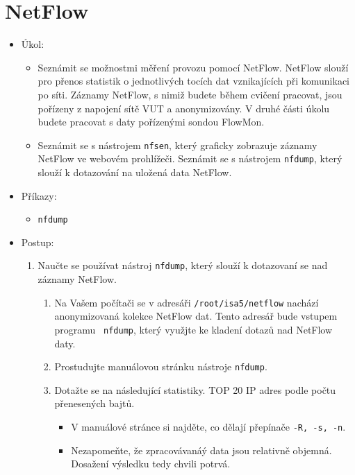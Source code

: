 \section{NetFlow}
  \begin{itemize}
    \item Úkol:
        \begin{itemize}
            \item Seznámit se možnostmi měření provozu pomocí NetFlow. NetFlow slouží pro
            přenos statistik o jednotlivých tocích dat vznikajících při komunikaci po síti.
            Záznamy NetFlow, s nimiž budete během cvičení pracovat, jsou
            pořízeny z napojení sítě VUT a anonymizovány. V druhé části úkolu
            budete pracovat s daty pořízenými sondou FlowMon.
            \item Seznámit se s nástrojem {\tt nfsen}, který graficky zobrazuje záznamy
            NetFlow ve webovém prohlížeči. Seznámit se s nástrojem {\tt nfdump}, který slouží k dotazování na uložená data NetFlow.
        \end{itemize}
    \item Příkazy:
        \begin{itemize}
            \item {\tt nfdump}
        \end{itemize}
    \item Postup:
        \begin{enumerate}
            \item Naučte se používat nástroj {\tt nfdump}, který slouží k dotazovaní se nad záznamy NetFlow.
                \begin{enumerate}
                    \item Na Vašem počítači se v adresáři {\tt /root/isa5/netflow} nachází
                    anonymizovaná kolekce NetFlow dat. Tento adresář bude vstupem programu {\tt
                    nfdump}, který využjte ke kladení dotazů nad NetFlow daty.
                    \item Prostudujte manuálovou stránku nástroje {\tt nfdump}.
                    \item Dotažte se na následující statistiky. TOP 20 IP adres podle počtu přenesených bajtů. 
                        \begin{itemize}
                            \item V manuálové stránce si najděte, co dělají přepínače {\tt -R, -s, -n}.
                            \item Nezapomeňte, že zpracovávanáý data jsou relativně objemná. Dosažení výsledku tedy chvili potrvá.

\end{itemize}
\end{enumerate}
\end{enumerate}
\end{itemize}
